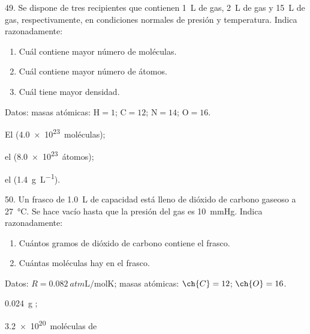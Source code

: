 \documentclass[10pt]{article}
\begin{document}
\begin{multicols}{2}
\begin{exercise}
  49. Se dispone de tres recipientes que contienen \SI{1}{\liter} de  gas,
  \SI{2}{\liter} de  gas y \SI{15}{\liter} de  gas, respectivamente, en condiciones normales de presión y temperatura. Indica razonadamente:
  \begin{enumerate}
    \item Cuál contiene mayor número de moléculas.
    \item Cuál contiene mayor número de átomos.
    \item Cuál tiene mayor densidad.
  \end{enumerate}
  Datos: masas atómicas: $\textrm{H} = 1$; $\textrm{C} = 12$; $\textrm{N} = 14$; $\textrm{O} = 16$.
\end{exercise}
\begin{solution}
  \begin{enumerate*}
    \item El  (\SI{4.0e23}{moléculas});
    \item el  (\SI{8.0e23}{átomos});
    \item el  (\SI{1.4}{\gram\per\liter}).
  \end{enumerate*}
\end{solution}

\begin{exercise}
  50. Un frasco de \SI{1.0}{\liter} de capacidad está lleno de dióxido de carbono gaseoso a \SI{27}{\celsius}. Se hace vacío hasta que la presión del
  gas es \SI{10}{\mmHg}. Indica razonadamente:
  \begin{enumerate}
    \item Cuántos gramos de dióxido de carbono contiene el frasco.
    \item Cuántas moléculas hay en el frasco.
  \end{enumerate}
  Datos: $R = \SI{0.082}{atm\liter\per\mole\kelvin}$; masas atómicas: $\ch{C} = 12$; $\ch{O} = 16$.
\end{exercise}
\begin{solution}
  \begin{enumerate*}
    \item \SI{0.024}{\gram} ;
    \item \SI{3.2e20}{moléculas} de 
  \end{enumerate*}
\end{solution}

\end{multicols}
\end{document}
